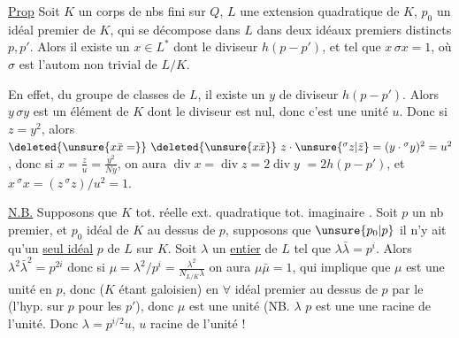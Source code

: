 \uline{Prop} Soit $K$ un corps de nbs fini sur $Q$,
$L$ une extension quadratique de $K$, $p_0$ un idéal
premier de $K$,  qui se décompose dans $L$ dans
deux idéaux premiers distincts $p,p'$. Alors il
existe un $x\in L^*$ 
 dont le diviseur  $h(p-p')$,  et tel que
 $x\,\sigma x=1$, où $\sigma$ est l'autom non trivial de $L/K$.

En effet,  du groupe de
classes  de $L$, il existe un $y$ de diviseur
$h(p-p')$. Alors $y\,\sigma y$ est un élément de $K$ dont le
diviseur est  nul, donc c'est une unité $u$.
Donc si $z=y^2$, alors $\deleted{\unsure{x\bar x=}}\ \deleted{\unsure{x\bar x}}\ z\cdot\unsure{{}^{\sigma}z|\bar z}=(y\cdot{}^\sigma y)^2=u^2$,
donc si $x=\frac zu=\frac{y^2}{Ny}$, on aura $\operatorname{div}x=\operatorname{div}z=2\operatorname{div}y$
$=2h(p-p')$, et $x\,{}^\sigma x=(z\,{}^\sigma z)/u^2=1$.

\uline{N.B.} Supposons que $K$  tot. réelle 
  ext. quadratique
 tot. imaginaire 
. Soit $p$ un nb premier, et
$p_0$ idéal de $K$ au dessus de $p$, supposons que $\unsure{p_0|p}$ il n'y ait
qu'un \uline{seul idéal}  $p$  de $L$ sur $K$. Soit $\lambda$ un
\uline{entier} de $L$ tel que $\lambda\bar\lambda=p^i$. Alors $\lambda^2\bar\lambda^2=p^{2i}$ donc
si $\mu=\lambda^2/p^i=\frac{\lambda^2}{N_{L/K}\lambda}$ on aura $\mu\bar\mu=1$, 
qui implique que $\mu$ est une unité en $p$, donc ($K$ étant galoisien)
en $\forall$ idéal premier au dessus de $p$ par le  (l'hyp. sur
$p$     pour les $p'$), donc $\mu$ est une unité (NB. $\lambda$  $p$ est une
une racine de l'unité. Donc $\lambda=p^{i/2}u$, $u$ racine
de l'unité !

